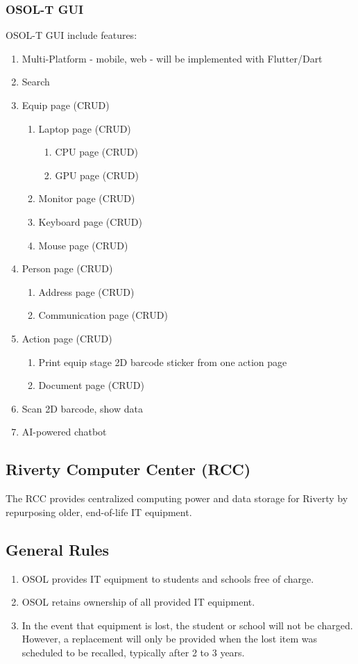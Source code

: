 \documentclass[a4paper,11pt]{article}
\begin{document}
\subsubsection{OSOL-T GUI}
OSOL-T GUI include features:
\begin{enumerate}
	\item Multi-Platform - mobile, web - will be implemented with Flutter/Dart
	\item Search
	\item Equip page (CRUD)
	\begin{enumerate}
		\item Laptop page (CRUD)
		\begin{enumerate}
			\item CPU page (CRUD)
			\item GPU page (CRUD)
		\end{enumerate}
		\item Monitor page (CRUD)
		\item Keyboard page (CRUD)
		\item Mouse page (CRUD)
	\end{enumerate}
	\item Person page (CRUD)
	\begin{enumerate}
		\item Address page (CRUD)
		\item Communication page (CRUD) 
	\end{enumerate}
	\item Action page (CRUD)
	\begin{enumerate}
		\item Print equip stage 2D barcode sticker from one action page
		\item Document page (CRUD)
	\end{enumerate}
	\item Scan 2D barcode, show data
	\item AI-powered chatbot
\end{enumerate}

\subsection{Riverty Computer Center (RCC)}
The RCC provides centralized computing power and data storage for Riverty by repurposing older, end-of-life IT equipment.

\subsection{General Rules}
\begin{enumerate}
	\item OSOL provides IT equipment to students and schools free of charge.
	\item OSOL retains ownership of all provided IT equipment.
	\item In the event that equipment is lost, the student or school will not be charged. However, a replacement will only be provided when the lost item was scheduled to be recalled, typically after 2 to 3 years.
\end{enumerate}
\end{document}
